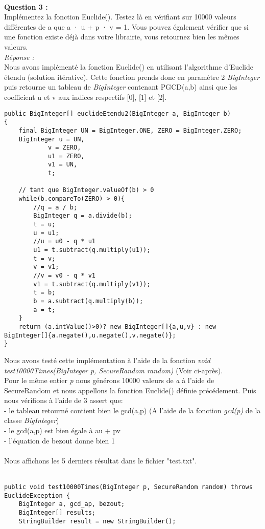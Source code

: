 \documentclass[a4paper,11pt]{article}
\begin{document}
        \textbf{\\Question 3 : \\}Implémentez la fonction Euclide(). Testez là en vérifiant sur 10000 valeurs différentes de a que a · u + p · v = 1. Vous pouvez également vérifier que si une fonction existe déjà dans votre librairie, vous retournez bien les mêmes valeurs.
        \textit{\\Réponse :} \\Nous avons implémenté la fonction Euclide() en utilisant l'algorithme d'Euclide étendu (solution itérative). Cette fonction prends donc en paramètre 2 \textit{BigInteger} puis retourne un tableau de \textit{BigInteger} contenant PGCD(a,b) ainsi que les coefficient u et v aux indices respectifs [0], [1] et [2].\\\begin{lstlisting}[caption ={Euclide étendu itératif}, captionpos=b,breaklines = true]
public BigInteger[] euclideEtendu2(BigInteger a, BigInteger b)
{
    final BigInteger UN = BigInteger.ONE, ZERO = BigInteger.ZERO;
    BigInteger u = UN,
            v = ZERO,
            u1 = ZERO,
            v1 = UN,
            t;

    // tant que BigInteger.valueOf(b) > 0
    while(b.compareTo(ZERO) > 0){
        //q = a / b;
        BigInteger q = a.divide(b);
        t = u;
        u = u1;
        //u = u0 - q * u1
        u1 = t.subtract(q.multiply(u1));
        t = v;
        v = v1;
        //v = v0 - q * v1
        v1 = t.subtract(q.multiply(v1));
        t = b;
        b = a.subtract(q.multiply(b));
        a = t;
    }
    return (a.intValue()>0)? new BigInteger[]{a,u,v} : new BigInteger[]{a.negate(),u.negate(),v.negate()};
}\end{lstlisting}Nous avons testé cette implémentation à l'aide de la fonction \textit{ void test10000Times(BigInteger p, SecureRandom random) } (Voir ci-après).\\Pour le même entier \textit{p} nous générons 10000 valeurs de \textit{a} à l'aide de SecureRandom et nous appellons la fonction Euclide() définie précédement. Puis nous vérifions à l'aide de 3 assert que:\\ - le tableau retourné contient bien le gcd(a,p) (A l'aide de la fonction \textit{gcd(p)} de la classe \textit{BigInteger})\\ - le gcd(a,p) est bien égale à au + pv\\ - l'équation de bezout donne bien 1\\\\ Nous affichons les 5 derniers résultat dans le fichier "test.txt". \\\\\begin{lstlisting}[caption ={testEuclide}, captionpos=b,breaklines = true]
public void test10000Times(BigInteger p, SecureRandom random) throws EuclideException {
    BigInteger a, gcd_ap, bezout;
    BigInteger[] results;
    StringBuilder result = new StringBuilder();


\end{lstlisting}
\end{document}
